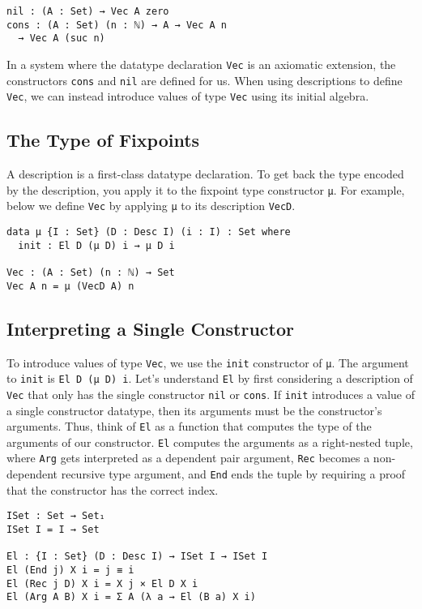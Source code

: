 \documentclass[preprint,nonatbib]{sigplanconf}
\begin{document}
\begin{verbatim}
nil : (A : Set) → Vec A zero
cons : (A : Set) (n : ℕ) → A → Vec A n
  → Vec A (suc n)
\end{verbatim}

In a system where the datatype declaration {\tt Vec} is an axiomatic
extension, the constructors {\tt cons} and {\tt nil} are defined for
us. When using descriptions to define {\tt Vec}, we can instead
introduce values of type {\tt Vec} using its initial algebra.

\subsection{The Type of Fixpoints}

A description is a first-class datatype declaration. To get back the
type encoded by the description, you apply it to the fixpoint type
constructor {\tt μ}. For example, below we define {\tt Vec} by
applying {\tt μ} to its description {\tt VecD}.

\begin{verbatim}
data μ {I : Set} (D : Desc I) (i : I) : Set where
  init : El D (μ D) i → μ D i

Vec : (A : Set) (n : ℕ) → Set
Vec A n = μ (VecD A) n
\end{verbatim}

\subsection{Interpreting a Single Constructor}
\label{sec:init:el}

To introduce values of type {\tt Vec}, we use the
{\tt init} constructor of {\tt μ}. The argument to {\tt init} is
{\tt El D (μ D) i}. Let's understand {\tt El} by first considering a
description of {\tt Vec} that only has the single constructor
{\tt nil} or {\tt cons}. If {\tt init} introduces
a value of a single constructor datatype, then its arguments must be
the constructor's arguments. Thus, think of
{\tt El} as a function that computes the type of the arguments of our
constructor. {\tt El} computes the arguments as a right-nested tuple,
where {\tt Arg} gets interpreted as a dependent pair argument,
{\tt Rec} becomes a non-dependent recursive type argument, and
{\tt End} ends the tuple by requiring a proof that the constructor has
the correct index.

\begin{verbatim}
ISet : Set → Set₁
ISet I = I → Set

El : {I : Set} (D : Desc I) → ISet I → ISet I
El (End j) X i = j ≡ i
El (Rec j D) X i = X j × El D X i
El (Arg A B) X i = Σ A (λ a → El (B a) X i)
\end{verbatim}
\end{document}
